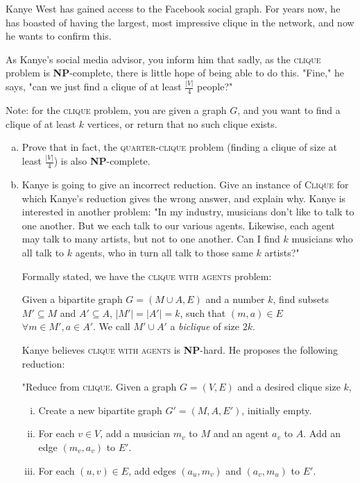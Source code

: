 \documentclass{article}\usepackage[utf8]{inputenc}\usepackage[margin=0.4cm,top=0.4cm,bottom=0.4cm]{geometry}\usepackage[usenames,dvipsnames,svgnames,table]{xcolor}
\begin{document}
\noindent Kanye West has gained access to the Facebook social graph. For years now, he has boasted of having the
largest, most impressive clique in the network, and now he wants to confirm this.

\vspace{4pt}\noindent As Kanye's social media advisor, you inform him that sadly, as the \textsc{clique} problem is \textbf{NP}-complete, there is little hope of being able to do this. "Fine," he says, "can we just find a clique of at least $\frac{|V|}4$ people?"

\vspace{4pt}\noindent Note: for the \textsc{clique} problem, you are given a graph $G$, and you want to find a clique of at least $k$ vertices, or return that no such clique exists.

\begin{enumerate}[a.]
\item Prove that in fact, the \textsc{quarter-clique} problem (finding a clique of size at least $\frac{|V|}
4$) is also \textbf{NP}-complete.
\BeginSolution %

\EndSolution
\item Kanye is going to give an incorrect reduction. Give an instance of \textsc{Clique} for which Kanye's reduction gives the wrong answer, and explain why. Kanye is interested in another problem: "In my industry, musicians don't like to talk to one another. But we each talk to our various agents. Likewise, each agent may talk to many artists, but not to one another. Can I find $k$ musicians who all talk to $k$ agents, who in turn all talk to those same $k$ artists?"

Formally stated, we have the \textsc{clique with agents} problem:

\begin{addmargin}[0.75cm]{0cm}
Given a bipartite graph $G = (M \cup A,E)$ and a number $k$, find subsets $M' \subseteq M$ and $A' \subseteq A$,
$|M'| = |A'| = k$, such that $(m,a) \in E$ $\forall m \in M',a \in A'$. We call $M' \cup A'$ a \textit{biclique} of size $2k$.
\end{addmargin}

Kanye believes \textsc{clique with agents} is \textbf{NP}-hard. He proposes the following reduction:

\begin{addmargin}[0.75cm]{0cm}
"Reduce from \textsc{clique}. Given a graph $G = (V,E)$ and a desired clique size $k$,
\begin{enumerate}[(i)]
\item Create a new bipartite graph $G' = (M,A,E')$, initially empty.
\item For each $v \in V$, add a musician $m_v$ to $M$ and an agent $a_v$ to $A$. Add an edge $(m_v,a_v)$ to $E'$.
\item For each $(u, v) \in E$, add edges $(a_u,m_v)$ and $(a_v,m_u)$ to $E'$.
\end{enumerate}


\end{addmargin}
\end{enumerate}
\end{document}
